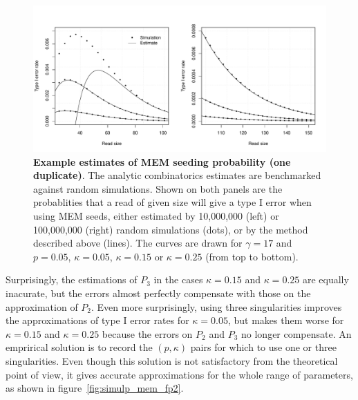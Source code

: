 \documentclass{article}
\begin{document}
\begin{figure}[h]
\centering
\includegraphics[scale=0.445]{simulp_mem_fp.pdf}
\caption{\textbf{Example estimates of MEM seeding probability (one
duplicate)}. The analytic combinatorics estimates are benchmarked against
random simulations. Shown on both panels are the probablities that a read
of given size will give a type I error when using MEM seeds, either
estimated by 10,000,000 (left) or 100,000,000 (right) random simulations
(dots), or by the method described above (lines). The curves are drawn for
$\gamma=17$ and $p=0.05$, $\kappa=0.05$, $\kappa=0.15$ or $\kappa=0.25$
(from top to bottom).}
\label{fig:simulp_mem_fp}
\end{figure}

Surprisingly, the estimations of $P_3$ in the cases $\kappa=0.15$ and
$\kappa=0.25$ are equally inacurate, but the errors almost perfectly
compensate with those on the approximation of $P_2$. Even more
surprisingly, using three singularities improves the approximations of
type I error rates for $\kappa=0.05$, but makes them worse for
$\kappa=0.15$ and $\kappa=0.25$ because the errors on $P_2$ and $P_3$ no
longer compensate. An emprirical solution is to record the $(p,\kappa)$
pairs for which to use one or three singularities. Even though this
solution is not satisfactory from the theoretical point of view, it gives
accurate approximations for the whole range of parameters, as shown in
figure~\ref{fig:simulp_mem_fp2}.
\end{document}
